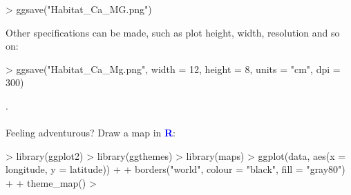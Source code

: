 \documentclass[a4paper,12pt]{article}
\newcommand\boldblue[1]{\textcolor{blue}{\textbf{#1}}}
\begin{document}
\begin{shaded}
\begin{Schunk}
\begin{Sinput}
> ggsave("Habitat_Ca_MG.png")
\end{Sinput}
\end{Schunk}
\end{shaded}

Other specifications can be made, such as plot height, width, resolution and so on:

\begin{shaded}
\begin{Schunk}
\begin{Sinput}
> ggsave("Habitat_Ca_Mg.png", width = 12, height = 8, units = "cm", dpi = 300)
\end{Sinput}
\end{Schunk}
\end{shaded}


{.}\\\\
Feeling adventurous? Draw a map in \boldblue{R}:

\begin{shaded}
\begin{Schunk}
\begin{Sinput}
> library(ggplot2)
> library(ggthemes)
> library(maps)
> ggplot(data, aes(x = longitude, y = latitude)) +
+     borders("world", colour = "black", fill = "gray80") +
+     theme_map()
> 
\end{Sinput}
\end{Schunk}
\end{shaded}



\end{document}
